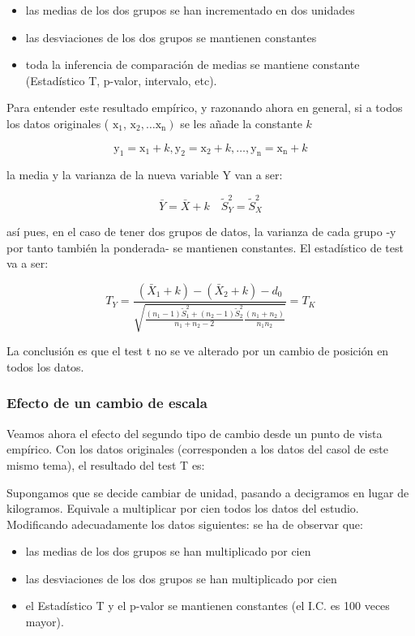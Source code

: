 \documentclass[
]{article}
\providecommand{\tightlist}{%
  \setlength{\itemsep}{0pt}\setlength{\parskip}{0pt}}
\begin{document}
\begin{itemize}
\tightlist
\item
  las medias de los dos grupos se han incrementado en dos unidades
\item
  las desviaciones de los dos grupos se mantienen constantes
\item
  toda la inferencia de comparación de medias se mantiene constante (Estadístico T, p-valor, intervalo, etc).
\end{itemize}

Para entender este resultado empírico, y razonando ahora en general, si a todos los datos originales ( \(\mathrm{x}_{1}\), \(\left.\mathrm{x}_{2}, \ldots \mathrm{x}_{\mathrm{n}}\right)\) se les añade la constante \(k\)

\[
\mathrm{y}_{1}=\mathrm{x}_{1}+k, \mathrm{y}_{2}=\mathrm{x}_{2}+k, \ldots, \mathrm{y}_{\mathrm{n}}=\mathrm{x}_{\mathrm{n}}+k
\]

la media y la varianza de la nueva variable Y van a ser:

\[
\bar{Y}=\bar{X}+k \quad \widetilde{S}_{Y}^{2}=\widetilde{S}_{X}^{2}
\]

así pues, en el caso de tener dos grupos de datos, la varianza de cada grupo -y por tanto también la ponderada- se mantienen constantes. El estadístico de test va a ser:

\[
T_{Y}=\frac{\left(\bar{X}_{1}+k\right)-\left(\bar{X}_{2}+k\right)-d_{0}}{\sqrt{\frac{\left(n_{1}-1\right) \widetilde{S}_{1}^{2}+\left(n_{2}-1\right) \widetilde{S}_{2}^{2}}{n_{1}+n_{2}-2} \frac{\left(n_{1}+n_{2}\right)}{n_{1} n_{2}}}}=T_{K}
\]

La conclusión es que el test t no se ve alterado por un cambio de posición en todos los datos.

\subsubsection{Efecto de un cambio de escala}\label{efecto-de-un-cambio-de-escala}

Veamos ahora el efecto del segundo tipo de cambio desde un punto de vista empírico. Con los datos originales (corresponden a los datos del casol de este mismo tema), el resultado del test T es:

Supongamos que se decide cambiar de unidad, pasando a decigramos en lugar de kilogramos. Equivale a multiplicar por cien todos los datos del estudio. Modificando adecuadamente los datos siguientes:
se ha de observar que:

\begin{itemize}
\tightlist
\item
  las medias de los dos grupos se han multiplicado por cien
\item
  las desviaciones de los dos grupos se han multiplicado por cien
\item
  el Estadístico T y el p-valor se mantienen constantes (el I.C. es 100 veces mayor).
\end{itemize}
\end{document}
